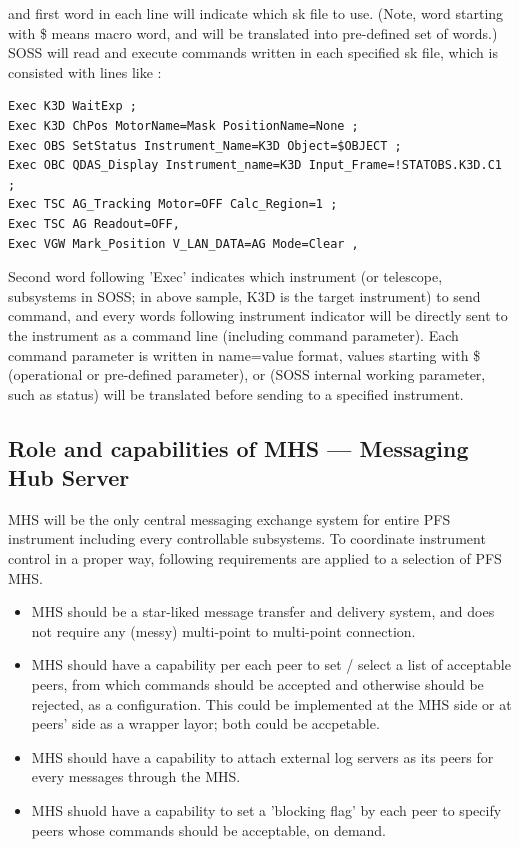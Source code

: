 \documentclass[a4paper,notitlepage]{article}
\begin{document}
and first word in each line will indicate which sk file to use. (Note, word 
starting with \$ means macro word, and will be translated into pre-defined 
set of words.) 
SOSS will read and execute commands written in each specified sk file, 
which is consisted with lines like :

\begin{verbatim}
Exec K3D WaitExp ;
Exec K3D ChPos MotorName=Mask PositionName=None ;
Exec OBS SetStatus Instrument_Name=K3D Object=$OBJECT ;
Exec OBC QDAS_Display Instrument_name=K3D Input_Frame=!STATOBS.K3D.C1 ;
Exec TSC AG_Tracking Motor=OFF Calc_Region=1 ;
Exec TSC AG Readout=OFF,
Exec VGW Mark_Position V_LAN_DATA=AG Mode=Clear ,
\end{verbatim}

Second word following 'Exec' indicates which instrument (or telescope, 
subsystems in SOSS; in above sample, K3D is the target instrument) 
to send command, and every words following instrument 
indicator will be directly sent to the instrument as a command line 
(including command parameter). Each command parameter is written in name=value 
format, values starting with \$ (operational or pre-defined parameter), or \! 
(SOSS internal working parameter, such as status) will be translated before 
sending to a specified instrument. 

\subsection{Role and capabilities of MHS --- Messaging Hub Server}
\label{MHS_Role}

MHS will be the only central messaging exchange system for entire PFS 
instrument including every controllable subsystems. 
To coordinate instrument control in a proper way, 
following requirements are applied to a selection of PFS MHS. 

\begin{itemize}
  \item MHS should be a star-liked message transfer and delivery system, 
    and does not require any (messy) multi-point to multi-point connection.
  \item MHS should have a capability per each peer to set / select 
    a list of acceptable peers, from which commands should be accepted and 
    otherwise should be rejected, as a configuration. 
    This could be implemented at the MHS side or at peers' side as a wrapper 
    layor; both could be accpetable.
  \item MHS should have a capability to attach external log servers as its 
    peers for every messages through the MHS. 
  \item MHS shuold have a capability to set a 'blocking flag' by each peer 
    to specify peers whose commands should be acceptable, on demand.
\end{itemize}
\end{document}
